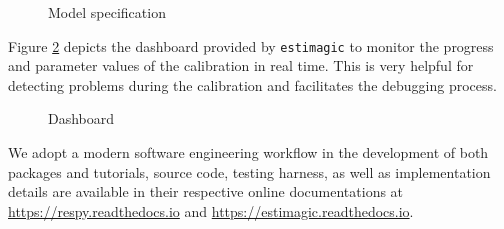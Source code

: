 \begin{figure}[h!]\centering
\caption{Model specification}\label{Model specification}
\hspace{0.3cm}
\end{figure}\FloatBarrier

\noindent Figure \ref{Dashboard} depicts the dashboard provided by \verb+estimagic+ to monitor the progress and parameter values of the calibration in real time. This is very helpful for detecting problems during the calibration and facilitates the debugging process.

\begin{figure}[h!]\centering
\caption{Dashboard}\label{Dashboard}
\end{figure}\FloatBarrier

\noindent We adopt a modern software engineering workflow in the development of both packages and tutorials, source code, testing harness, as well as implementation details are available in their respective online documentations at \url{https://respy.readthedocs.io} and \url{https://estimagic.readthedocs.io}.
